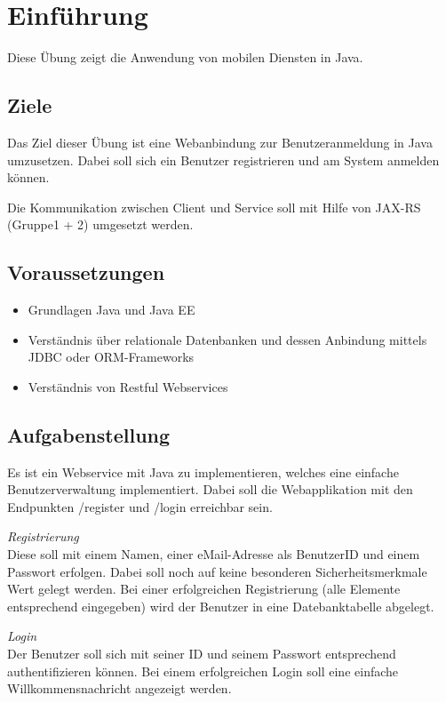 
\section{Einführung}
Diese Übung zeigt die Anwendung von mobilen Diensten in Java.

\subsection{Ziele}
Das Ziel dieser Übung ist eine Webanbindung zur Benutzeranmeldung in Java umzusetzen. Dabei soll sich ein Benutzer registrieren und am System anmelden können.

Die Kommunikation zwischen Client und Service soll mit Hilfe von JAX-RS (Gruppe1 + 2) umgesetzt werden.


\subsection{Voraussetzungen}
\begin{itemize}
\item Grundlagen Java und Java EE
\item Verständnis über relationale Datenbanken und dessen Anbindung mittels JDBC oder ORM-Frameworks
\item Verständnis von Restful Webservices
\end{itemize}


\subsection{Aufgabenstellung}
Es ist ein Webservice mit Java zu implementieren, welches eine einfache Benutzerverwaltung implementiert. Dabei soll die Webapplikation mit den Endpunkten /register und /login erreichbar sein.

\textit{Registrierung}\\
Diese soll mit einem Namen, einer eMail-Adresse als BenutzerID und einem Passwort erfolgen. Dabei soll noch auf keine besonderen Sicherheitsmerkmale Wert gelegt werden. Bei einer erfolgreichen Registrierung (alle Elemente entsprechend eingegeben) wird der Benutzer in eine Datebanktabelle abgelegt.

\textit{Login}\\
Der Benutzer soll sich mit seiner ID und seinem Passwort entsprechend authentifizieren können. Bei einem erfolgreichen Login soll eine einfache Willkommensnachricht angezeigt werden.

